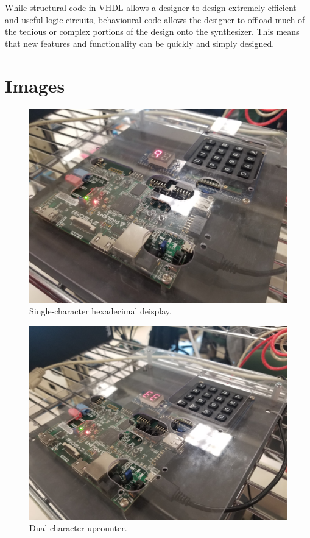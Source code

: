 \documentclass{article}
\begin{document}
While structural code in VHDL allows a designer to design extremely efficient and useful
logic circuits, behavioural code allows the designer to offload much of the tedious or complex
portions of the design onto the synthesizer.
This means that new features and functionality can be quickly and simply designed.

\newpage

\section{Images}

    \begin{figure}[H]
        \includegraphics[width=125mm]{display_single.jpg}
        \caption{Single-character hexadecimal deisplay.}
        \label{fig:display_single}
    \end{figure}

    
    \begin{figure}[H]
        \includegraphics[width=125mm]{counter_dual.jpg}
        \caption{Dual character upcounter.}
        \label{fig:counter_dual}
    \end{figure}
\end{document}
